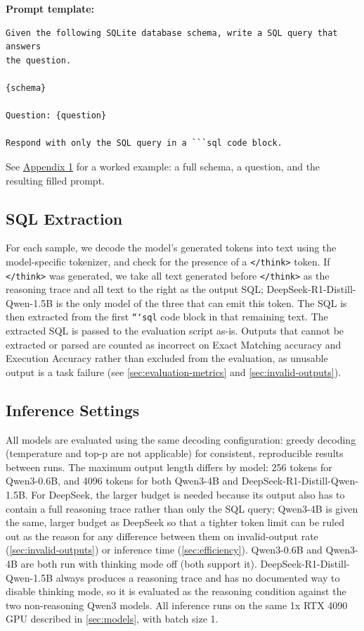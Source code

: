\textbf{Prompt template:}
\begin{verbatim}
Given the following SQLite database schema, write a SQL query that answers
the question.

{schema}

Question: {question}

Respond with only the SQL query in a ```sql code block.
\end{verbatim}

See \hyperref[sec:appendix1]{Appendix 1} for a worked example: a full schema, a question, and the resulting filled prompt.

\subsection{SQL Extraction}
\label{sec:sql-extraction}

For each sample, we decode the model's generated tokens into text using the model-specific tokenizer, and check for the presence of a \texttt{</think>} token. If \texttt{</think>} was generated, we take all text generated before \texttt{</think>} as the reasoning trace and all text to the right as the output SQL; DeepSeek-R1-Distill-Qwen-1.5B is the only model of the three that can emit this token. The SQL is then extracted from the first \texttt{```sql} code block in that remaining text. The extracted SQL is passed to the evaluation script as-is. Outputs that cannot be extracted or parsed are counted as incorrect on Exact Matching accuracy and Execution Accuracy rather than excluded from the evaluation, as unusable output is a task failure (see \ref{sec:evaluation-metrics} and \ref{sec:invalid-outputs}).

\subsection{Inference Settings}
\label{sec:inference-settings}

All models are evaluated using the same decoding configuration: greedy decoding (temperature and top-p are not applicable) for consistent, reproducible results between runs. The maximum output length differs by model: 256 tokens for Qwen3-0.6B, and 4096 tokens for both Qwen3-4B and DeepSeek-R1-Distill-Qwen-1.5B. For DeepSeek, the larger budget is needed because its output also has to contain a full reasoning trace rather than only the SQL query; Qwen3-4B is given the same, larger budget as DeepSeek so that a tighter token limit can be ruled out as the reason for any difference between them on invalid-output rate (\ref{sec:invalid-outputs}) or inference time (\ref{sec:efficiency}). Qwen3-0.6B and Qwen3-4B are both run with thinking mode off (both support it). DeepSeek-R1-Distill-Qwen-1.5B always produces a reasoning trace and has no documented way to disable thinking mode, so it is evaluated as the reasoning condition against the two non-reasoning Qwen3 models. All inference runs on the same 1x RTX 4090 GPU described in \ref{sec:models}, with batch size 1.

